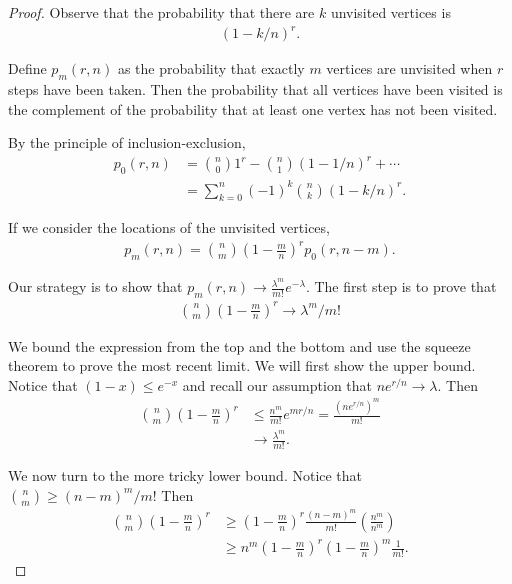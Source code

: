 \documentclass[12pt]{article}
\theoremstyle{definition}
\begin{document}
\begin{proof}
Observe that the probability that there are $k$ unvisited vertices is
\begin{align}
(1-k/n)^r \nonumber.
\end{align}

Define $p_m(r,n)$ as the probability that exactly $m$ vertices are unvisited
when $r$ steps have been taken.
Then the probability that all vertices have been visited is the complement
of the probability that at least one vertex has not been visited.

By the principle of inclusion-exclusion,
\begin{align}
p_0(r,n) &= {n \choose 0} 1^r - {n \choose 1} (1-1/n)^r + \cdots \nonumber\\
&= \sum_{k=0}^n (-1)^k {n \choose k} (1-k/n)^r. \label{eqn:p0}
\end{align}

If we consider the locations of the unvisited vertices,
\begin{align}
p_m(r,n) = {n \choose m} \left(1-\frac{m}{n}\right)^r p_0(r, n-m). \nonumber
\end{align}

Our strategy is to show that $p_m(r,n) \rightarrow \frac{\lambda^m}{m!}e^{-\lambda}$.
The first step is to prove that
\begin{align}
{n \choose m} \left(1-\frac{m}{n}\right)^r \rightarrow \lambda ^m /m! \label{eqn:lim}
\end{align}

We bound the expression from the top and the bottom and use the squeeze
theorem to prove the most recent limit.
We will first show the upper bound.
Notice that $(1-x) \leq e^{-x}$ and recall our assumption that
$ne^{r/n} \rightarrow \lambda$.
Then
\begin{align}
{n \choose m} \left(1-\frac{m}{n}\right)^r &\leq \frac{n^m}{m!} e^{mr/n} 
= \frac{(n e^{r/n})^m} {m!} \nonumber \\
&\rightarrow \frac{\lambda ^m} {m!}. \nonumber
\end{align}

We now turn to the more tricky lower bound.
Notice that ${n \choose m} \geq (n-m)^m / m!$
Then
\begin{align}
{n \choose m} \left(1-\frac{m}{n}\right)^r
&\geq \left(1-\frac{m}{n}\right)^r \frac{(n-m)^m}{m!}
\left( \frac{n^m}{n^m} \right) \nonumber\\
&\geq n^m (1 - \frac{m}{n})^r (1- \frac{m}{n})^m  \frac{1}{m!}. \nonumber
\end{align}


\end{proof}
\end{document}
